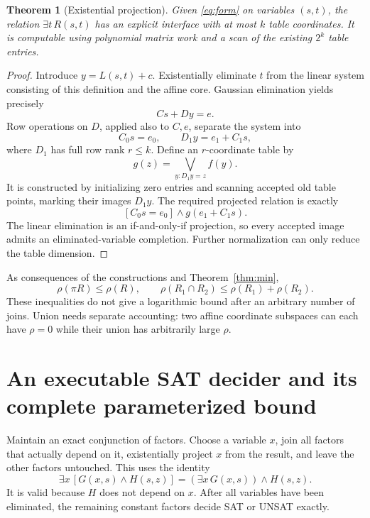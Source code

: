 \documentclass[11pt]{article}
\newtheorem{theorem}{Theorem}
\begin{document}
\begin{theorem}[Existential projection]\label{thm:projection}
Given \eqref{eq:form} on variables $(s,t)$, the relation $\exists t\,R(s,t)$ has an
explicit interface with at most $k$ table coordinates. It is computable using
polynomial matrix work and a scan of the existing $2^k$ table entries.
\end{theorem}
\begin{proof}
Introduce $y=L(s,t)+c$. Existentially eliminate $t$ from the linear system consisting
of this definition and the affine core. Gaussian elimination yields precisely
\[
 Cs+Dy=e.
\]
Row operations on $D$, applied also to $C,e$, separate the system into
\[
 C_0s=e_0,\qquad D_1y=e_1+C_1s,
\]
where $D_1$ has full row rank $r\le k$. Define an $r$-coordinate table by
\[
 g(z)=\bigvee_{y:D_1y=z}f(y).
\]
It is constructed by initializing zero entries and scanning accepted old table
points, marking their images $D_1y$. The required projected relation is exactly
\[
 [C_0s=e_0]\land g(e_1+C_1s).
\]
The linear elimination is an if-and-only-if projection, so every accepted image
admits an eliminated-variable completion. Further normalization can only reduce
the table dimension.
\end{proof}

As consequences of the constructions and Theorem~\ref{thm:min},
\[
 \rho(\pi R)\le\rho(R),\qquad
 \rho(R_1\cap R_2)\le\rho(R_1)+\rho(R_2).
\]
These inequalities do not give a logarithmic bound after an arbitrary number of
joins. Union needs separate accounting: two affine coordinate subspaces can each
have $\rho=0$ while their union has arbitrarily large $\rho$.

\section{An executable SAT decider and its complete parameterized bound}
Maintain an exact conjunction of factors. Choose a variable $x$, join all factors
that actually depend on it, existentially project $x$ from the result, and leave the
other factors untouched. This uses the identity
\[
 \exists x\,[G(x,s)\land H(s,z)]
   =(\exists x\,G(x,s))\land H(s,z).
\]
It is valid because $H$ does not depend on $x$. After all variables have been
eliminated, the remaining constant factors decide SAT or UNSAT exactly.
\end{document}
